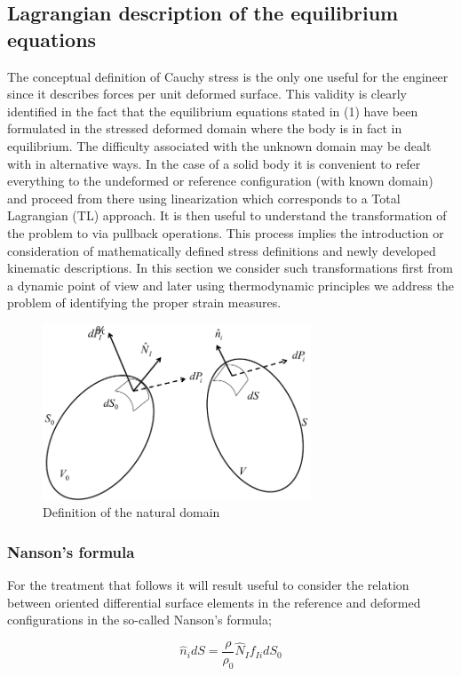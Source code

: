 \subsection{Lagrangian description of the equilibrium equations}
The conceptual definition of Cauchy stress is the only one useful for the engineer since it describes forces per unit deformed surface.  This validity is clearly identified in the fact that the equilibrium equations stated in (1) have been formulated in the stressed deformed domain   where the body is in fact in equilibrium.  The difficulty associated with the unknown domain may be dealt with in alternative ways.  In the case of a solid body it is convenient to refer everything to the undeformed or reference configuration (with known domain)   and proceed from there using linearization which corresponds to a Total Lagrangian (TL) approach.  It is then useful to understand the transformation of the problem to   via pullback operations.  This process implies the introduction or consideration of mathematically  defined stress definitions and newly developed kinematic descriptions.  In this section we consider such transformations first from a dynamic point of view and later using thermodynamic principles we address the problem of identifying the proper strain measures.
\begin{figure}[h]
\centering
\includegraphics[width=8cm]{img/figure1_2.pdf}
\caption{Definition of the natural domain}
\label{fig:natural domain}
\end{figure}

\subsubsection*{Nanson's formula}
For the treatment that follows it will result useful to consider the relation between oriented differential surface elements in the reference and deformed configurations in the so-called Nanson's formula;

\begin{equation}
\hat{n}_{i}dS=\frac{\rho}{\rho _0}\hat{N}_I f_{Ii}dS_0
\label{nanson}
\end{equation}

